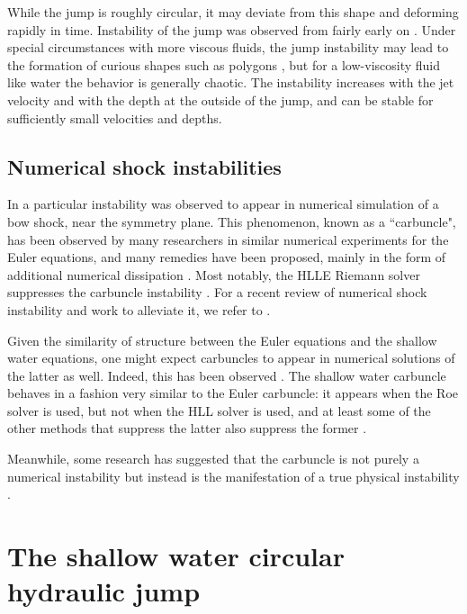 \documentclass{article}
\begin{document}
While the jump is roughly circular, it may deviate from this shape and
deforming rapidly in time.
Instability of the jump was observed from fairly early on \cite{craik1981circular}.
Under special circumstances with more viscous fluids, the jump instability may lead to
the formation of curious shapes such as polygons \cite{ellegaard1998creating}, but
for a low-viscosity fluid like water the behavior is generally chaotic.
The instability increases with the jet velocity and with the depth at the outside of the jump,
and can be stable for sufficiently small velocities and depths.

\subsection{Numerical shock instabilities}

In \cite{peery1988blunt} a particular instability was observed to
appear in numerical simulation of a bow shock, near the symmetry plane.
This phenomenon, known as a ``carbuncle", has been observed by many researchers
in similar numerical experiments for the Euler equations, and many remedies
have been proposed, mainly in the form of additional numerical dissipation
\cite{quirk1997contribution,pandolfi2001numerical,dumbser2004matrix,chauvat2005shock,ismail2009proposed,shen2014stability}.
Most notably, the HLLE Riemann solver suppresses the carbuncle instability \cite{quirk1997contribution}.
For a recent review of numerical shock instability and work to alleviate it,
we refer to \cite[Section 2.5]{simonnumerical}.

Given the similarity of structure between the Euler equations and the shallow
water equations, one might expect carbuncles to appear in numerical
solutions of the latter as well.  Indeed, this has been observed \cite{kemm2014note}.
The shallow water carbuncle behaves in a fashion very similar to the
Euler carbuncle: it appears when the Roe solver is used, but not when
the HLL solver is used, and at least some of the other methods that suppress
the latter also suppress the former \cite{kemm2014note,bader2014carbuncle}.

Meanwhile, some research has suggested that the carbuncle is not purely a
numerical instability but instead is the manifestation of a true physical
instability \cite{moschetta2001carbuncle,elling2009carbuncle}.

\section{The shallow water circular hydraulic jump}
\end{document}
